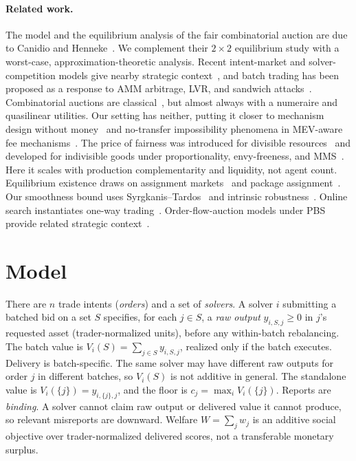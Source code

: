 \documentclass{llncs}
\begin{document}
\paragraph{Related work.}
The model and the equilibrium analysis of the fair combinatorial auction
are due to Canidio and Henneke~\cite{canidio2024}. We complement their
$2\times2$ equilibrium study with a worst-case, approximation-theoretic
analysis. Recent intent-market and solver-competition models give
nearby strategic context~\cite{chitra2024}, and batch trading has been
proposed as a response to AMM arbitrage, LVR, and sandwich
attacks~\cite{canidio2023}. Combinatorial auctions are
classical~\cite{cramton2006}, but almost always with a numeraire and
quasilinear utilities. Our setting has neither, putting it closer to
mechanism design without money~\cite{procaccia2013} and no-transfer
impossibility phenomena in MEV-aware fee mechanisms~\cite{bahrani2024}.
The price of fairness was introduced for divisible
resources~\cite{bertsimas2011} and developed for indivisible goods under
proportionality, envy-freeness, and
MMS~\cite{barman2020,bei2019,caragiannis2012}. Here it scales with
production complementarity and liquidity, not agent count. Equilibrium
existence draws on assignment markets~\cite{shapley1971} and package
assignment~\cite{bikhchandani2002}. Our smoothness bound uses
Syrgkanis--Tardos~\cite{syrgkanis2013} and intrinsic
robustness~\cite{roughgarden2015}. Online search instantiates one-way
trading~\cite{elyaniv2001}. Order-flow-auction models under PBS
provide related strategic context~\cite{ma2025}.

\section{Model}\label{sec:model}

There are $n$ trade intents (\emph{orders}) and a set of \emph{solvers}.
A solver $i$ submitting a batched bid on a set $S$ specifies, for each
$j\in S$, a \emph{raw output} $y_{i,S,j}\ge0$ in $j$'s requested asset
(trader-normalized units), before any within-batch rebalancing. The batch
value is
$V_i(S)=\sum_{j\in S}y_{i,S,j}$, realized only if the batch executes.
Delivery is batch-specific. The same solver may have different raw outputs
for order $j$ in different batches, so $V_i(S)$ is not additive in
general. The standalone value is $V_i(\{j\})=y_{i,\{j\},j}$, and the
floor is $c_j=\max_iV_i(\{j\})$. Reports are \emph{binding}. A solver
cannot claim raw output or delivered value it cannot produce, so relevant
misreports are downward. Welfare $W=\sum_jw_j$ is an additive social
objective over trader-normalized delivered scores, not a transferable
monetary surplus.
\end{document}

